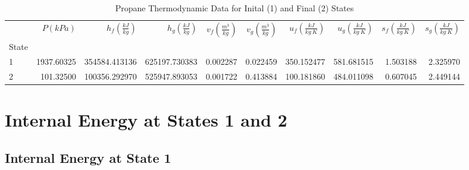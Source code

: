 \documentclass[10pt,parskip=half,
toc=sectionentrywithdots,
bibliography=totocnumbered,
captions=tableheading,numbers=noendperiod]{scrartcl}
\begin{document}
\begin{table}[H]
\caption{Propane Thermodynamic Data for Inital (1) and Final (2) States}\label{tbl:thermo}
\centering
\begin{adjustbox}{max width=\textwidth}
\begin{tabular}{lrrrrrrrrr}
\toprule
{} &  $P \left(kPa\right)$ &  $h_f \left(\frac{kJ}{kg}\right)$ &  $h_g \left(\frac{kJ}{kg}\right)$ &  $v_f \left(\frac{m^3}{kg}\right)$ &  $v_g \left(\frac{m^3}{kg}\right)$ &  $u_f \left(\frac{kJ}{kg\:K}\right)$ &  $u_g \left(\frac{kJ}{kg\:K}\right)$ &  $s_f \left(\frac{kJ}{kg\:K}\right)$ &  $s_g \left(\frac{kJ}{kg\:K}\right)$ \\
State &                       &                                   &                                   &                                    &                                    &                                      &                                      &                                      &                                      \\
\midrule
1     &            1937.60325 &                     354584.413136 &                     625197.730383 &                           0.002287 &                           0.022459 &                           350.152477 &                           581.681515 &                             1.503188 &                             2.325970 \\
2     &             101.32500 &                     100356.292970 &                     525947.893053 &                           0.001722 &                           0.413884 &                           100.181860 &                           484.011098 &                             0.607045 &                             2.449144 \\
\bottomrule
\end{tabular}

\end{adjustbox}
\end{table}

\hypertarget{internal-energy-at-states-1-and-2}{%
\section{Internal Energy at States 1 and
2}\label{internal-energy-at-states-1-and-2}}

\hypertarget{internal-energy-at-state-1}{%
\subsection{Internal Energy at State
1}\label{internal-energy-at-state-1}}
\end{document}
